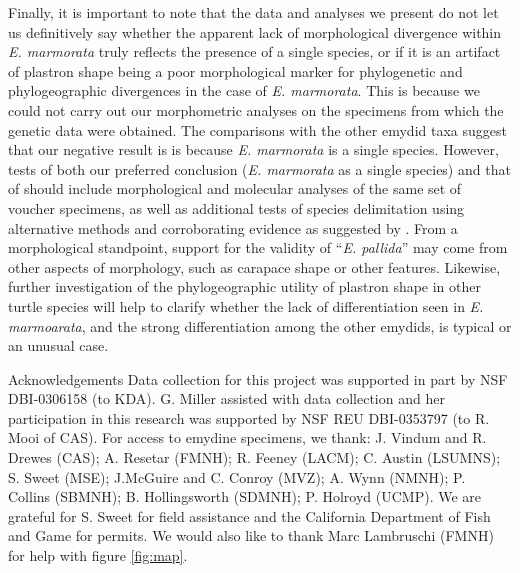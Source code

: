 \documentclass[12pt,letterpaper]{article}
\renewcommand{\section}[1]{%
\bigskip
\begin{center}
\begin{Large}
\normalfont\scshape #1
\medskip
\end{Large}
\end{center}}
\begin{document}
Finally, it is important to note that the data and analyses we present do not let us definitively say whether the apparent lack of morphological divergence within \textit{E. marmorata} truly reflects the presence of a single species, or if it is an artifact of plastron shape being a poor morphological marker for phylogenetic and phylogeographic divergences in the case of \textit{E. marmorata}. This is because we could not carry out our morphometric analyses on the specimens from which the genetic data were obtained. The comparisons with the other emydid taxa suggest that our negative result is is because \textit{E. marmorata} is a single species. However, tests of both our preferred conclusion (\textit{E. marmorata} as a single species) and that of \citet{Spinks2014} should include morphological and molecular analyses of the same set of voucher specimens, as well as additional tests of species delimitation using alternative methods and corroborating evidence as suggested by \citet{Carstens2013}. From a morphological standpoint, support for the validity of ``\textit{E. pallida}'' may come from other aspects of morphology, such as carapace shape or other features. Likewise, further investigation of the phylogeographic utility of plastron shape in other turtle species will help to clarify whether the lack of differentiation seen in \textit{E. marmoarata}, and the strong differentiation among the other emydids, is typical or an unusual case.


\section*{Acknowledgements}
Data collection for this project was supported in part by NSF DBI-0306158 (to KDA). G. Miller assisted with data collection and her participation in this research was supported by NSF REU DBI-0353797 (to R. Mooi of CAS). For access to emydine specimens, we thank: J. Vindum and R. Drewes (CAS); A. Resetar (FMNH); R. Feeney (LACM); C. Austin (LSUMNS); S. Sweet (MSE); J.McGuire and C. Conroy (MVZ); A. Wynn (NMNH); P. Collins (SBMNH); B. Hollingsworth (SDMNH); P. Holroyd (UCMP). We are grateful for S. Sweet for field assistance and the California Department of Fish and Game for permits. We would also like to thank Marc Lambruschi (FMNH) for help with figure \ref{fig:map}.



\end{document}
